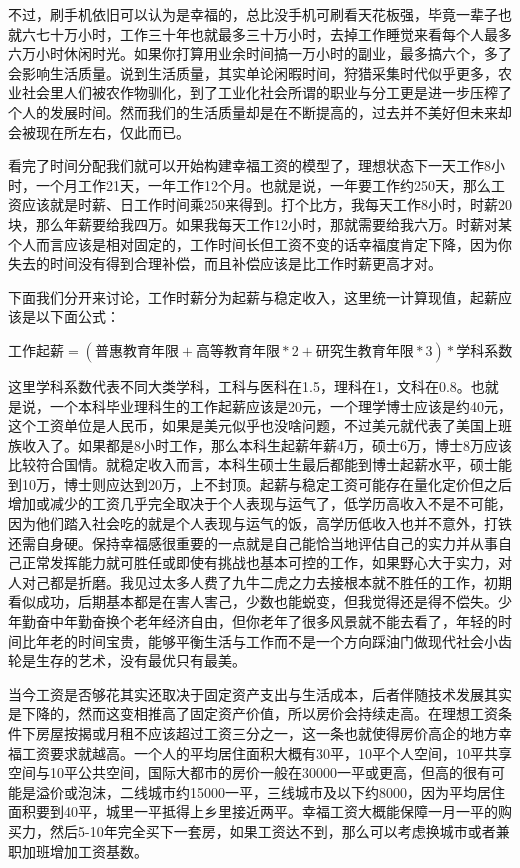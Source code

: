 \documentclass[
  letterpaper,
  DIV=11,
  numbers=noendperiod]{scrreprt}
\begin{document}
不过，刷手机依旧可以认为是幸福的，总比没手机可刷看天花板强，毕竟一辈子也就六七十万小时，工作三十年也就最多三十万小时，去掉工作睡觉来看每个人最多六万小时休闲时光。如果你打算用业余时间搞一万小时的副业，最多搞六个，多了会影响生活质量。说到生活质量，其实单论闲暇时间，狩猎采集时代似乎更多，农业社会里人们被农作物驯化，到了工业化社会所谓的职业与分工更是进一步压榨了个人的发展时间。然而我们的生活质量却是在不断提高的，过去并不美好但未来却会被现在所左右，仅此而已。

看完了时间分配我们就可以开始构建幸福工资的模型了，理想状态下一天工作8小时，一个月工作21天，一年工作12个月。也就是说，一年要工作约250天，那么工资应该就是时薪、日工作时间乘250来得到。打个比方，我每天工作8小时，时薪20块，那么年薪要给我四万。如果我每天工作12小时，那就需要给我六万。时薪对某个人而言应该是相对固定的，工作时间长但工资不变的话幸福度肯定下降，因为你失去的时间没有得到合理补偿，而且补偿应该是比工作时薪更高才对。

下面我们分开来讨论，工作时薪分为起薪与稳定收入，这里统一计算现值，起薪应该是以下面公式：

\(工作起薪 = (普惠教育年限 + 高等教育年限*2 + 研究生教育年限*3) * 学科系数\)

这里学科系数代表不同大类学科，工科与医科在1.5，理科在1，文科在0.8。也就是说，一个本科毕业理科生的工作起薪应该是20元，一个理学博士应该是约40元，这个工资单位是人民币，如果是美元似乎也没啥问题，不过美元就代表了美国上班族收入了。如果都是8小时工作，那么本科生起薪年薪4万，硕士6万，博士8万应该比较符合国情。就稳定收入而言，本科生硕士生最后都能到博士起薪水平，硕士能到10万，博士则应达到20万，上不封顶。起薪与稳定工资可能存在量化定价但之后增加或减少的工资几乎完全取决于个人表现与运气了，低学历高收入不是不可能，因为他们踏入社会吃的就是个人表现与运气的饭，高学历低收入也并不意外，打铁还需自身硬。保持幸福感很重要的一点就是自己能恰当地评估自己的实力并从事自己正常发挥能力就可胜任或即使有挑战也基本可控的工作，如果野心大于实力，对人对己都是折磨。我见过太多人费了九牛二虎之力去接根本就不胜任的工作，初期看似成功，后期基本都是在害人害己，少数也能蜕变，但我觉得还是得不偿失。少年勤奋中年勤奋换个老年经济自由，但你老年了很多风景就不能去看了，年轻的时间比年老的时间宝贵，能够平衡生活与工作而不是一个方向踩油门做现代社会小齿轮是生存的艺术，没有最优只有最美。

当今工资是否够花其实还取决于固定资产支出与生活成本，后者伴随技术发展其实是下降的，然而这变相推高了固定资产价值，所以房价会持续走高。在理想工资条件下房屋按揭或月租不应该超过工资三分之一，这一条也就使得房价高企的地方幸福工资要求就越高。一个人的平均居住面积大概有30平，10平个人空间，10平共享空间与10平公共空间，国际大都市的房价一般在30000一平或更高，但高的很有可能是溢价或泡沫，二线城市约15000一平，三线城市及以下约8000，因为平均居住面积要到40平，城里一平抵得上乡里接近两平。幸福工资大概能保障一月一平的购买力，然后5-10年完全买下一套房，如果工资达不到，那么可以考虑换城市或者兼职加班增加工资基数。
\end{document}
